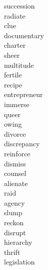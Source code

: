 \documentclass[a4paper, 10pt]{ctexart}
\begin{document}
\begin{multicols*}{2}
\begin{description}
\item[succession]

\item[radiate]

\item[clue]

\item[documentary]

\item[charter]

\item[sheer]

\item[multitude]

\item[fertile]

\item[recipe]

\item[entrepreneur]

\item[immerse]

\item[queer]

\item[owing]

\item[divorce]

\item[discrepancy]

\item[reinforce]

\item[dismiss]

\item[counsel]

\item[alienate]

\item[raid]

\item[agency]

\item[slump]

\item[reckon]

\item[disrupt]

\item[hierarchy]

\item[thrift]

\item[legislation]


\end{description}
\end{multicols*}
\end{document}
